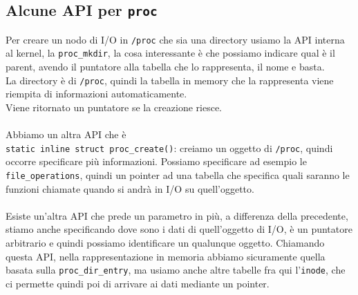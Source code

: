 \documentclass[12pt, oneside]{extbook}
\begin{document}
\subsection{Alcune API per \texttt{proc}}
Per creare un nodo di I/O in \texttt{/proc} che sia una directory usiamo la API interna al kernel, la \texttt{proc\_mkdir}, la cosa interessante è che possiamo indicare qual è il parent, avendo il puntatore alla tabella che lo rappresenta, il nome e basta.\\La directory è di \texttt{/proc}, quindi la tabella in memory che la rappresenta viene riempita di informazioni automaticamente.\\Viene ritornato un puntatore se la creazione riesce.\\\\Abbiamo un altra API che è\\ \texttt{static inline struct proc\_create()}: creiamo un oggetto di \texttt{/proc}, quindi occorre specificare più informazioni. Possiamo specificare ad esempio le \texttt{file\_operations}, quindi un pointer ad una tabella che specifica quali saranno le funzioni chiamate quando si andrà in I/O su quell'oggetto.\\\\Esiste un'altra API che prede un parametro in più, a differenza della precedente, stiamo anche specificando dove sono i dati di quell'oggetto di I/O, è un puntatore arbitrario e quindi possiamo identificare un qualunque oggetto. Chiamando questa API, nella rappresentazione in memoria abbiamo sicuramente quella basata sulla \texttt{proc\_dir\_entry}, ma usiamo anche altre tabelle fra qui l'\texttt{inode}, che ci permette quindi poi di arrivare ai dati mediante un pointer.
\end{document}
